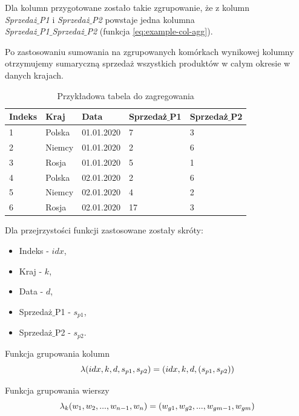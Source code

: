 \documentclass[brudnopis]{xmgr}
\begin{document}
Dla kolumn przygotowane zostało takie zgrupowanie, że z kolumn\\
\emph{Sprzedaż$\_$P1} i \emph{Sprzedaż$\_$P2} powstaje jedna kolumna\\ \emph{Sprzedaż$\_$P1$\_$Sprzedaż$\_$P2} (funkcja \ref{eq:example-col-agg}).
\medskip

Po zastosowaniu sumowania na zgrupowanych komórkach wynikowej kolumny otrzymujemy sumaryczną sprzedaż wszystkich produktów w całym okresie w danych krajach.

\begin{table}[!tbh]
\begin{tabular}{|l|l|l|l|l|} \hline
Indeks & Kraj & Data & Sprzedaż$\_$P1 & Sprzedaż$\_$P2 \\ \hline
1 & Polska & 01.01.2020 & 7 & 3 \\ \hline
2 & Niemcy & 01.01.2020 & 2 & 6 \\ \hline
3 & Rosja & 01.01.2020 & 5 & 1 \\ \hline
4 & Polska & 02.01.2020 & 2 & 6 \\ \hline
5 & Niemcy & 02.01.2020 & 4 & 2 \\ \hline
6 & Rosja & 02.01.2020 & 17 & 3 \\ \hline
\end{tabular}
\caption{Przykładowa tabela do zagregowania \label{tab:example-input}}
\end{table}
\medskip

Dla przejrzystości funkcji zastosowane zostały skróty:
\medskip
\begin{itemize}
    \item Indeks - $idx$,
    \item Kraj - $k$,
    \item Data - $d$,
    \item Sprzedaż$\_$P1 - $s_{p1}$,
    \item Sprzedaż$\_$P2 - $s_{p2}$.
\end{itemize}
\medskip

Funkcja grupowania kolumn
\begin{equation} \label{eq:example-col-agg}
\lambda (idx, k, d, s_{p1}, s_{p2}) \\ = (idx, k, d, (s_{p1}, s_{p2}))
\end{equation}
\medskip

Funkcja grupowania wierszy
\begin{equation} \label{eq:example-row-agg}
\lambda_k (w_1, w_2, ..., w_{n-1}, w_n) \\ = (w_{g1}, w_{g2}, ..., w_{gm-1}, w_{gm}) 
\end{equation}
\medskip
\end{document}
